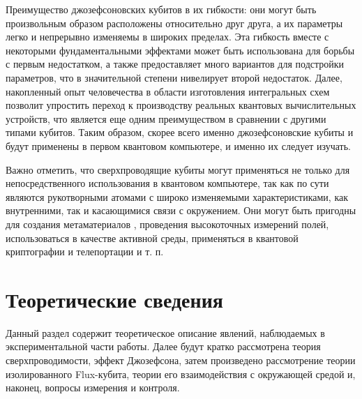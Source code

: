 \documentclass[12pt, twoside]{report}
\numberwithin{equation}{section}
\numberwithin{figure}{section}
\begin{document}
Преимущество джозефсоновских кубитов в их гибкости: они могут быть произвольным образом расположены относительно друг друга, а их параметры легко и непрерывно изменяемы в широких пределах. Эта гибкость вместе с некоторыми фундаментальными эффектами\cite{Koch2007} может быть использована для борьбы с первым недостатком, а также предоставляет много вариантов для подстройки параметров, что в значительной степени нивелирует второй недостаток. Далее, накопленный опыт человечества в области изготовления интегральных схем позволит упростить переход к производству реальных квантовых вычислительных устройств, что является еще одним преимуществом в сравнении с другими типами кубитов. Таким образом, скорее всего именно джозефсоновские кубиты и будут применены в первом квантовом компьютере, и именно их следует изучать.

Важно отметить, что сверхпроводящие кубиты могут применяться не только для непосредственного использования в квантовом компьютере, так как по сути являются рукотворными атомами с широко изменяемыми характеристиками, как внутренними, так и касающимися связи с окружением. Они могут быть пригодны для создания метаматериалов \cite{Macha2014}, проведения высокоточных измерений полей\cite{Clarke2006}, использоваться в качестве активной среды\cite{Astafiev2010}, применяться в квантовой криптографии и телепортации \cite{Xia2014} и т. п. 
\newpage
\chapter{Теоретические сведения} \label{chap:theory}
Данный раздел содержит теоретическое описание явлений, наблюдаемых в экспериментальной части работы. Далее будут кратко рассмотрена теория сверхпроводимости, эффект Джозефсона, затем произведено рассмотрение теории изолированного Flux-кубита, теории его взаимодействия с окружающей средой и, наконец, вопросы измерения и контроля. 
\end{document}
